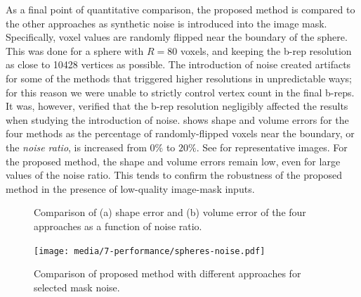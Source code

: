 As a final point of quantitative comparison, the proposed method is compared to the other approaches as synthetic noise is introduced into the image mask. Specifically, voxel values are randomly flipped near the boundary of the sphere. This was done for a sphere with $R = 80$ voxels, and keeping the b-rep resolution as close to 10428 vertices as possible.  The introduction of noise created artifacts for some of the methods that triggered higher resolutions in unpredictable ways; for this reason we were unable to strictly control vertex count in the final b-reps. It was, however, verified that the b-rep resolution negligibly affected the results when studying the introduction of noise.  shows shape and volume errors for the four methods as the percentage of randomly-flipped voxels near the boundary, or the {\em noise ratio}, is increased from $0\%$ to $20\%$. See  for representative images.  For the proposed method, the shape and volume errors remain low, even for large values of the noise ratio. This tends to confirm the robustness of the proposed method in the presence of low-quality image-mask inputs.
\begin{figure}[t!]
	\centering
	\caption{Comparison of (a) shape error and (b) volume error of the four approaches as a function of noise ratio.}
	\label{fig:graph4}
\end{figure}
\begin{figure}[b!]
	\centering
	\texttt{[image: media/7-performance/spheres-noise.pdf]}
	\caption{{Comparison of proposed method with different approaches for selected mask noise.}}
	\label{fig:demos4}
\end{figure}

